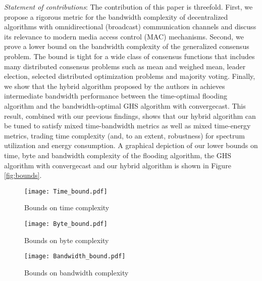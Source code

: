 \documentclass[letterpaper,10pt,conference]{ieeeconf}
\begin{document}
\emph{Statement of contributions}:
The contribution of this paper is threefold. First, we propose a rigorous metric for the bandwidth complexity of decentralized algorithms with omnidirectional (broadcast) communication channels and discuss its relevance to modern media access control (MAC) mechanisms. Second, we prove a lower bound on the bandwidth complexity of the generalized consensus problem. The bound is tight for a wide class of consensus functions that includes many distributed consensus problems such as mean and weighed mean, leader election, selected distributed optimization problems and majority voting. Finally, we show that the hybrid algorithm proposed by the authors in \cite{FR-MP:13} achieves intermediate bandwidth performance between the time-optimal flooding algorithm and the bandwidth-optimal GHS algorithm with convergecast. This result, combined with our previous findings, shows that our hybrid algorithm can be tuned to satisfy mixed time-bandwidth metrics as well as mixed time-energy metrics, trading time complexity (and, to an extent, robustness) for spectrum utilization and energy consumption. A graphical depiction of our lower bounds on time, byte and bandwidth complexity of the flooding algorithm, the GHS algorithm with convergecast and our hybrid algorithm is shown in Figure \ref{fig:bounds}.
\begin{figure*}[h!tp]
\centering
\begin{subfigure}[h]{0.3\textwidth}
\texttt{[image: Time\_bound.pdf]}
\caption{Bounds on time complexity}
\end{subfigure}
\begin{subfigure}[h]{0.3\textwidth}
\texttt{[image: Byte\_bound.pdf]}
\caption{Bounds on byte complexity}
\end{subfigure}
\begin{subfigure}[h]{0.3\textwidth}
\texttt{[image: Bandwidth\_bound.pdf]}
\caption{Bounds on bandwidth complexity}
\end{subfigure}
\caption{Bounds on time, byte and bandwidth complexity of the flooding algorithm (in blue, dashed), GHS algorithm with convergecast (in green, dash-dotted) and of our hybrid algorithm (in red, solid) as a function of the tuning parameter $m$ for a network of size $n=100$ with state size $b=768$ bits.
Our hybrid algorithm recovers the time-optimal performance of the flooding algorithm as $m\to n$. Conversely, the hybrid algorithm recovers the byte and bandwidth performance of the byte-optimal and bandwidth-optimal GHS algorithm with convergecast, presented in Section \ref{sec:algs}, as $m\to 1$.}
\label{fig:bounds}
\end{figure*}
\end{document}
